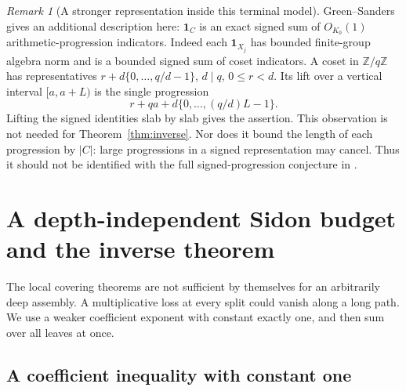 \documentclass[11pt,reqno]{amsart}
\numberwithin{equation}{section}
\theoremstyle{definition}
\theoremstyle{remark}
\newtheorem{remark}[theorem]{Remark}
\newcommand{\Z}{\mathbb Z}
\newcommand{\one}{\mathbf 1}
\begin{document}
\begin{remark}[A stronger representation inside this terminal model]
Green--Sanders~\cite{GreenSanders} gives an additional description here:
$\one_C$ is an exact signed sum of $O_{K_0}(1)$ arithmetic-progression
indicators. Indeed each $\one_{X_j}$ has bounded finite-group algebra
norm and is a bounded signed sum of coset indicators. A coset in
$\Z/q\Z$ has representatives
$r+d\{0,\ldots,q/d-1\}$, $d\mid q$, $0\le r<d$. Its lift over a
vertical interval $[a,a+L)$ is the single progression
\[
 r+qa+d\{0,\ldots,(q/d)L-1\}.
\]
Lifting the signed identities slab by slab gives the assertion. This
observation is not needed for Theorem~\ref{thm:inverse}. Nor does it
bound the length of each progression by $|C|$: large progressions in
a signed representation may cancel. Thus it should not be identified
with the full signed-progression conjecture in \cite{BG}.
\end{remark}

\section{A depth-independent Sidon budget and the inverse theorem}
\label{sec:gluing}

The local covering theorems are not sufficient by themselves for an
arbitrarily deep assembly. A multiplicative loss at every split could
vanish along a long path. We use a weaker coefficient exponent with
constant exactly one, and then sum over all leaves at once.

\subsection{A coefficient inequality with constant one}
\end{document}
